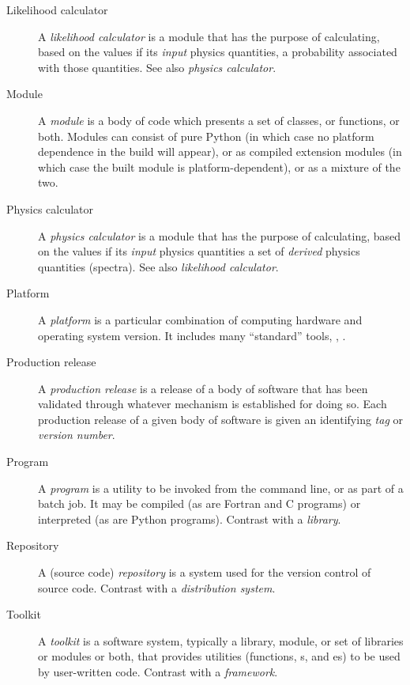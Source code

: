 \documentclass[draftmode,draftwater]{memarticle}
\begin{document}
\begin{description}
\item[Likelihood calculator] A \emph{likelihood calculator} is a module
  that has the purpose of calculating, based on the values if its
  \emph{input} physics quantities, a probability associated with those
  quantities. See also \emph{physics calculator}.

\item[Module] A \emph{module} is a body of code which presents a set of
  classes, or functions, or both. Modules can consist of pure Python (in
  which case no platform dependence in the build will appear), or as
  compiled extension modules (in which case the built module is
  platform-dependent), or as a mixture of the two.

\item[Physics calculator] A \emph{physics calculator} is a module that
  has the purpose of calculating, based on the values if its
  \emph{input} physics quantities a set of \emph{derived} physics
  quantities (\eg spectra). See also \emph{likelihood calculator}.

\item[Platform] A \emph{platform} is a particular combination of
  computing hardware and operating system version. It includes many
  ``standard'' tools, \eg, .

\item[Production release] A \emph{production release} is a release of a
  body of software that has been validated through whatever mechanism is
  established for doing so. Each production release of a given body of
  software is given an identifying \emph{tag} or \emph{version number}.

\item[Program] A \emph{program} is a utility to be invoked from the
  command line, or as part of a batch job. It may be compiled (as are
  Fortran and C programs) or interpreted (as are Python programs).
  Contrast with a \emph{library}.

\item[Repository] A (source code) \emph{repository} is a system used for
  the version control of source code. Contrast with a \emph{distribution
    system}.

\item[Toolkit] A \emph{toolkit} is a software system, typically a
  library, module, or set of libraries or modules or both, that provides
  utilities (functions, s, and es) to be used
  by user-written code. Contrast with a \emph{framework}.

\end{description}
\end{document}
